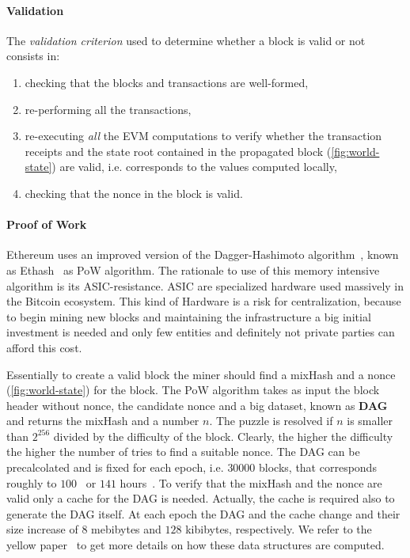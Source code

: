 \paragraph{Validation}
The \emph{validation criterion} used to determine whether a block is valid or
not consists in:
\begin{enumerate}
    \item checking that the blocks and transactions are well-formed,
    \item re-performing all the transactions,
    \item re-executing \emph{all} the EVM computations to verify whether the
    transaction receipts and the state root contained in the propagated block
    (\autoref{fig:world-state}) are valid, i.e. corresponds to the values
    computed locally,
    \item checking that the nonce in the block is valid.
\end{enumerate}

\paragraph{Proof of Work}
Ethereum uses an improved version of the
Dagger-Hashimoto algorithm~\cite{bib:dagger-hashimoto}, known as
Ethash~\cite[Appendix J]{wood2018ethereum} as PoW algorithm.
The rationale to use of this memory intensive algorithm is its
ASIC-resistance. ASIC are specialized hardware used massively in the Bitcoin
ecosystem. This kind of Hardware is a risk for centralization,
because to begin mining new blocks and maintaining the infrastructure a big
initial investment is needed and only few entities and definitely not private
parties can afford this cost.

Essentially to create a valid block the miner should find a mixHash and
a nonce (\autoref{fig:world-state}) for the block.
The PoW algorithm takes as input the block header without nonce,
the candidate nonce and a big dataset, known as \textbf{DAG} and
returns the mixHash and a number $n$. The puzzle is resolved if
$n$ is smaller than $2^{256}$ divided by the difficulty of the block. Clearly,
the higher the difficulty the higher the number of tries to find a suitable
nonce. The DAG can be precalcolated and is fixed for each epoch, i.e.
$30000$ blocks, that corresponds roughly to 
$100$~\cite{bib:ethereum-wiki-mining} or $141$ hours~\cite{bib:solidity-docs}.
To verify that the mixHash and the nonce are valid only a cache for the DAG is
needed. Actually, the cache is required also to generate the DAG itself.
At each epoch the DAG and the cache change and their size increase of
$8$ mebibytes and $128$ kibibytes, respectively.
We refer to the yellow paper~\cite[Appendix J]{wood2018ethereum} to get more
details on how these data structures are computed.



